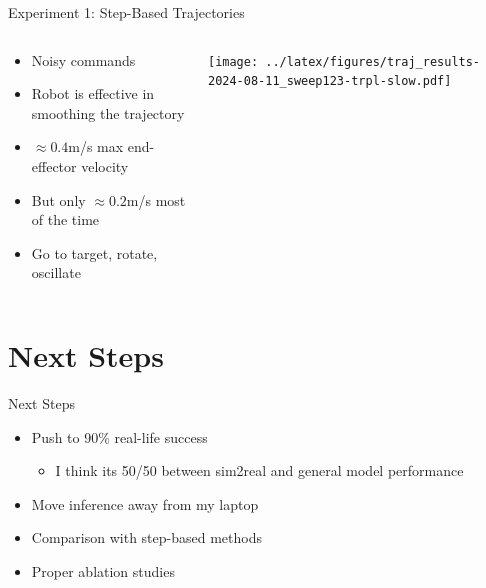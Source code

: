 \documentclass[16:9,en,navbarinfooter]{sdqbeamer}
\begin{document}
\begin{frame}{Experiment 1: Step-Based Trajectories}

	\begin{columns}[t]
		\begin{column}{0.3\textwidth}
			\vspace{1cm}
			\begin{itemize}
				\item Noisy commands
				\item Robot is effective in smoothing the trajectory
				\item $\approx0.4$m/s max end-effector velocity
				\item But only $\approx0.2$m/s most of the time
				\item Go to target, rotate, oscillate
			\end{itemize}
		\end{column}
		\begin{column}{0.7\textwidth}
			\vspace{1cm}
			\texttt{[image: ../latex/figures/traj\_results-2024-08-11\_sweep123-trpl-slow.pdf]}
		\end{column}
	\end{columns}
\end{frame}


\section{Next Steps}
\begin{frame}{Next Steps}

	\begin{itemize}
		\item Push to 90\% real-life success
		      \begin{itemize}
			      \item I think its 50/50 between sim2real and general model performance
		      \end{itemize}
		\item Move inference away from my laptop
		\item Comparison with step-based methods
		\item Proper ablation studies
	\end{itemize}
\end{frame}
\end{document}
